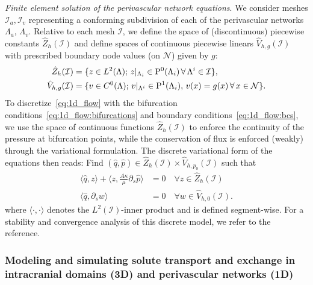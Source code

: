 \documentclass[fleqn,10pt]{wlscirep}
\begin{document}
\textit{Finite element solution of the perivascular network equations}. 
We consider meshes $\mathcal{I}_a, \mathcal{I}_v$ representing a
conforming subdivision of each of the perivascular networks
$\Lambda_a$, $\Lambda_v$. Relative to each mesh $\mathcal{I}$, we define the
space of (discontinuous) piecewise constants $\hat{Z}_h(\mathcal{I})$ and define
spaces of continuous piecewise linears $\hat{V}_{h, g}(\mathcal{I})$ with
prescribed boundary node values (on $\mathcal{N}$) given by $g$:
\begin{align}
  \hat{Z}_h(\mathcal{I}) &= \{z \in L^2(\Lambda) ; \, z \vert_{\Lambda_i} \in \mathrm{P}^{0}(\Lambda_i) \, \forall \, \Lambda^i \in \mathcal{I}\}, \\
  \hat{V}_{h, g}(\mathcal{I}) &= \{ v \in C^0(\Lambda) ; \, v \vert_{\Lambda^i} \in \mathrm{P}^1(\Lambda_i), \, v(x) = g(x) \, \forall \, x \in \mathcal{N} \} .
\end{align}
To discretize~\eqref{eq:1d_flow} with the bifurcation
conditions~\eqref{eq:1d_flow:bifurcations} and boundary
conditions~\eqref{eq:1d_flow:bcs}, we use the space of continuous
functions $\hat{Z}_h(\mathcal{I})$ to enforce the continuity of the pressure at
bifurcation points, while the conservation of flux is enforced
(weakly) through the variational formulation. The discrete variational form of the equations then reads: Find $(\hat{q}, \hat{p}) \in \hat{Z}_h(\mathcal{I}) \times \hat{V}_{h, p_0}(\mathcal{I})$ such that
\begin{subequations}
\begin{align}
  \langle \hat{q}, z \rangle +  \langle z, \frac{A \kappa}{\mu} \partial_s \hat{p}  \rangle &= 0 \quad \forall z \in \hat{Z}_h(\mathcal{I}) \\
  \langle \hat{q}, \partial_s w \rangle &= 0 \quad  \forall w \in \hat{V}_{h, 0}(\mathcal{I}).
\end{align}
\end{subequations}%
where $\langle \cdot, \cdot \rangle$ denotes the $L^2(\mathcal{I})$-inner product and is defined segment-wise. For a stability and convergence analysis of this discrete model, we refer to the reference\cite{gjerde2024directional}. 


\subsubsection{Modeling and simulating solute transport and exchange in intracranial domains (3D) and perivascular networks (1D)}
\label{sec:app:transport_eqs}
\end{document}
